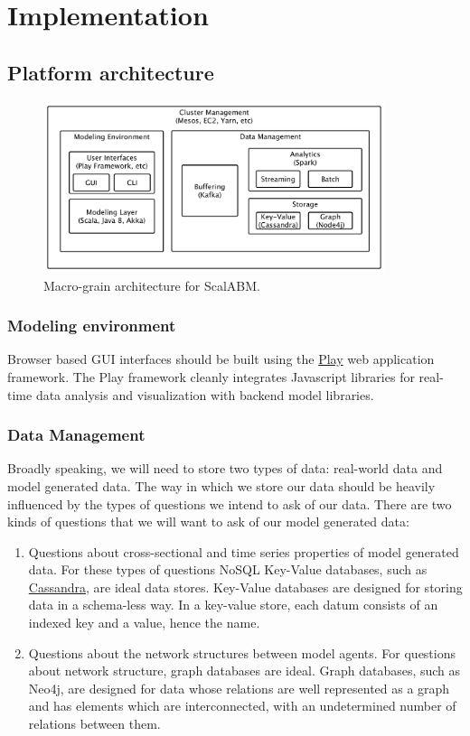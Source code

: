 \documentclass[11pt]{amsart}
\begin{document}
\section{Implementation}

\subsection{Platform architecture}

\begin{figure}[H]
\centering
\includegraphics[width=10cm]{img/coarse-grain-schema-2.pdf}
\caption{Macro-grain architecture for ScalABM. }
\end{figure}

\subsubsection{Modeling environment}
Browser based GUI interfaces should be built using the \href{https://www.playframework.com/}{Play} web application framework. The Play framework cleanly integrates Javascript libraries for real-time data analysis and visualization with backend model libraries.

\subsubsection{Data Management}
Broadly speaking, we will need to store two types of data: real-world data and model generated data. The way in which we store our data should be heavily influenced by the types of questions we intend to ask of our data. 
There are two kinds of questions that we will want to ask of our model generated data:
\begin{enumerate}
    \item Questions about cross-sectional and time series properties of model generated data. For these types of questions NoSQL Key-Value databases, such as \href{http://cassandra.apache.org/}{Cassandra},  are ideal data stores. Key-Value databases are designed for storing data in a schema-less way. In a key-value store, each datum consists of an indexed key and a value, hence the name. 
    \item Questions about the network structures between model agents. For questions about network structure, graph databases are ideal.  Graph databases, such as Neo4j, are designed for data whose relations are well represented as a graph and has elements which are interconnected, with an undetermined number of relations between them.
\end{enumerate} 
\end{document}
